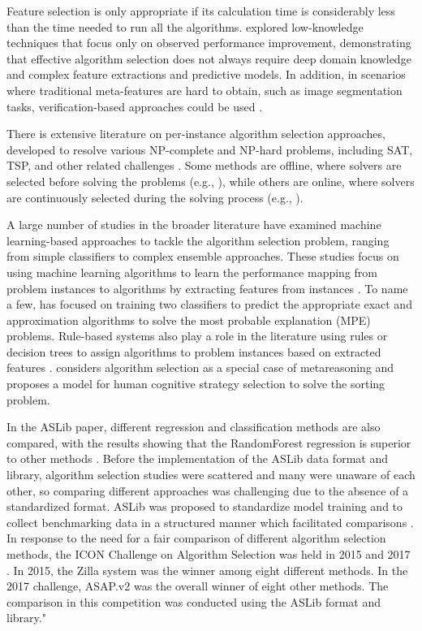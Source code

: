 Feature selection is only appropriate if its calculation time is considerably less than the time needed to run all the algorithms. \cite{Carchrae2005APPLYINGML} explored low-knowledge techniques that focus only on observed performance improvement, demonstrating that effective algorithm selection does not always require deep domain knowledge and complex feature extractions and predictive models. In addition, in scenarios where traditional meta-features are hard to obtain, such as image segmentation tasks, verification-based approaches could be used \cite{10194439}.

There is extensive literature on per-instance algorithm selection approaches, developed to resolve various NP-complete and NP-hard problems, including SAT, TSP, and other related challenges \cite{satzilla, 10.1007/978-3-642-31612-8_18, 10.1162/evco_a_00215, Kotthoff2014, 10.1162/evco_a_00242}. Some methods are offline, where solvers are selected before solving the problems (e.g., \cite{satzilla}), while others are online, where solvers are continuously selected during the solving process (e.g., \cite{arbelaez2009online}).

A large number of studies in the broader literature have examined machine learning-based approaches to tackle the algorithm selection problem, ranging from simple classifiers to complex ensemble approaches. These studies focus on using machine learning algorithms to learn the performance mapping from problem instances to algorithms by extracting features from instances \cite{Kotthoff2014}. To name a few, \cite{guo_learning-based_2005} has focused on training two classifiers to predict the appropriate exact and approximation algorithms to solve the most probable explanation (MPE) problems. Rule-based systems also play a role in the literature using rules or decision trees to assign algorithms to problem instances based on extracted features \cite{ali2006learning}. \cite{NIPS2014_7fb8ceb3} considers algorithm selection as a special case of metareasoning and proposes a model for human cognitive strategy selection to solve the sorting problem.

In the ASLib paper, different regression and classification methods are also compared, with the results showing that the RandomForest regression is superior to other methods \cite{BISCHL201641}. Before the implementation of the ASLib data format and library, algorithm selection studies were scattered and many were unaware of each other, so comparing different approaches was challenging due to the absence of a standardized format. ASLib was proposed to standardize model training and to collect benchmarking data in a structured manner which facilitated comparisons \cite{BISCHL201641}. In response to the need for a fair comparison of different algorithm selection methods, the ICON Challenge on Algorithm Selection was held in 2015 and 2017 \cite{LINDAUER201986}. In 2015, the Zilla system \cite{satzilla} was the winner among eight different methods. In the 2017 challenge, ASAP.v2 \cite{Gonard2019} was the overall winner of eight other methods. The comparison in this competition was conducted using the ASLib format and library."

